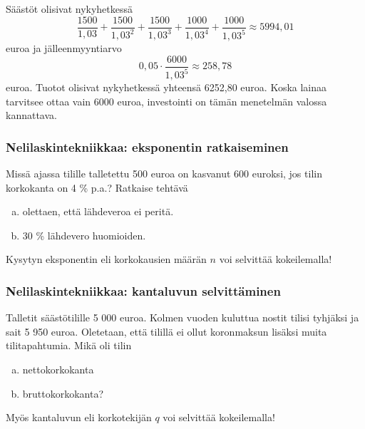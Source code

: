 \documentclass{beamer}
\begin{document}
\begin{frame}
    \begin{ratkaisu}
        Säästöt olisivat nykyhetkessä
        \[
            \frac{1500}{1,03} + \frac{1500}{1,03^2} + \frac{1500}{1,03^3} + \frac{1000}{1,03^4} + \frac{1000}{1,03^5}\approx 5994,01
       \]
       euroa ja jälleenmyyntiarvo
       \[
            0,05\cdot\frac{6000}{1,03^5}\approx 258,78
       \]
       euroa. Tuotot olisivat nykyhetkessä yhteensä 6252,80 euroa. Koska lainaa tarvitsee ottaa vain 6000 euroa,
       investointi on tämän menetelmän valossa kannattava.
    \end{ratkaisu}
\end{frame}

\begin{frame}
    \frametitle{Nelilaskintekniikkaa: eksponentin ratkaiseminen}
    \pause
    \begin{esim}
        Missä ajassa tilille talletettu 500 euroa on kasvanut 600 euroksi, jos tilin korkokanta on 4 \% p.a.?
        Ratkaise tehtävä
        \begin{enumerate}[(a)]
            \item olettaen, että lähdeveroa ei peritä.
            \item 30 \% lähdevero huomioiden.
        \end{enumerate}
    \end{esim}
    \pause
    Kysytyn eksponentin  eli korkokausien määrän $n$ voi selvittää kokeilemalla!
\end{frame}

\begin{frame}
    \frametitle{Nelilaskintekniikkaa: kantaluvun selvittäminen}
    \begin{esim}
        Talletit säästötilille 5 000 euroa. Kolmen vuoden kuluttua nostit tilisi tyhjäksi ja sait 5 950 euroa.
        Oletetaan, että tilillä ei ollut koronmaksun lisäksi muita tilitapahtumia. Mikä oli tilin
        \begin{enumerate}[(a)]
            \item nettokorkokanta
            \item bruttokorkokanta?
        \end{enumerate}
    \end{esim}
    \pause
    Myös kantaluvun eli korkotekijän $q$ voi selvittää kokeilemalla!
\end{frame}
\end{document}
